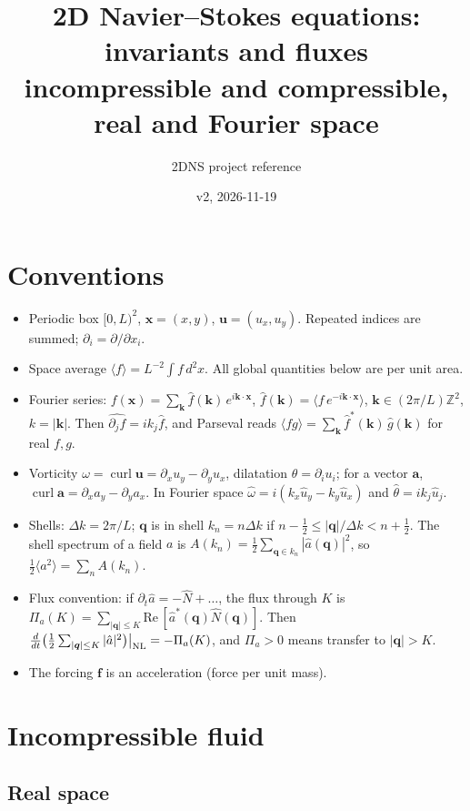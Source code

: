 \documentclass[11pt]{article}
\title{2D Navier--Stokes equations: invariants and fluxes\\
\large incompressible and compressible, real and Fourier space}
\author{2DNS project reference}
\date{v2, 2026-11-19}
\newcommand{\avg}[1]{\langle #1\rangle}
\newcommand{\curl}{\operatorname{curl}}
\begin{document}
\maketitle

\section{Conventions}

\begin{itemize}
\item Periodic box $[0,L)^2$, $\bm x=(x,y)$, $\bm u=(u_x,u_y)$. Repeated indices are summed; $\partial_i=\partial/\partial x_i$.
\item Space average $\avg{f}=L^{-2}\int f\,d^2x$. All global quantities below are per unit area.
\item Fourier series: $f(\bm x)=\sum_{\bm k}\hat f(\bm k)\,e^{i\bm k\cdot\bm x}$, $\hat f(\bm k)=\avg{f\,e^{-i\bm k\cdot\bm x}}$, $\bm k\in(2\pi/L)\mathbb Z^2$, $k=|\bm k|$.
Then $\widehat{\partial_j f}=ik_j\hat f$, and Parseval reads $\avg{fg}=\sum_{\bm k}\hat f^*(\bm k)\,\hat g(\bm k)$ for real $f,g$.
\item Vorticity $\omega=\curl\bm u=\partial_xu_y-\partial_yu_x$, dilatation $\theta=\partial_iu_i$; for a vector $\bm a$, $\curl\bm a=\partial_xa_y-\partial_ya_x$.
In Fourier space $\hat\omega=i(k_x\hat u_y-k_y\hat u_x)$ and $\hat\theta=ik_j\hat u_j$.
\item Shells: $\Delta k=2\pi/L$; $\bm q$ is in shell $k_n=n\Delta k$ if $n-\tfrac12\le|\bm q|/\Delta k<n+\tfrac12$.
The shell spectrum of a field $a$ is $A(k_n)=\tfrac12\sum_{\bm q\in k_n}|\hat a(\bm q)|^2$, so $\tfrac12\avg{a^2}=\sum_nA(k_n)$.
\item Flux convention: if $\partial_t\hat a=-\hat N+\dots$, the flux through $K$ is
$\Pi_a(K)=\sum_{|\bm q|\le K}\mathrm{Re}\,[\hat a^*(\bm q)\hat N(\bm q)]$. Then $\frac{d}{dt}\big(\tfrac12\sum_{|\bm q|\le K}|\hat a|^2\big)\big|_{\rm NL}=-\Pi_a(K)$, and $\Pi_a>0$ means transfer to $|\bm q|>K$.
\item The forcing $\bm f$ is an acceleration (force per unit mass).
\end{itemize}

\section{Incompressible fluid}

\subsection{Real space}
\end{document}
